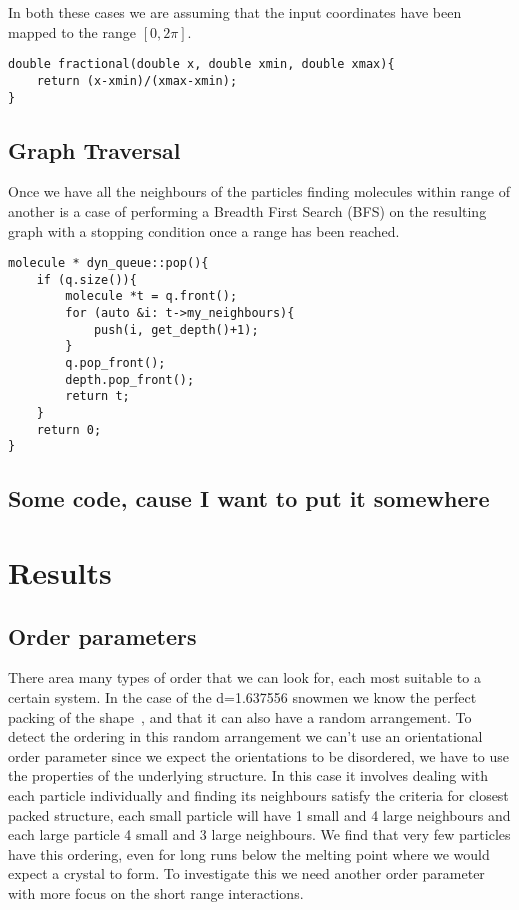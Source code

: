 In both these cases we are assuming that the input coordinates have been mapped to the range $[0,2\pi]$.

\begin{lstlisting}[language=myc]
double fractional(double x, double xmin, double xmax){
    return (x-xmin)/(xmax-xmin);
}

\end{lstlisting}

\section{Graph Traversal}
\label{sec:graph traversal}

Once we have all the neighbours of the particles finding molecules within range of another is a case of performing a Breadth First Search (BFS) on the resulting graph with a stopping condition once a range has been reached.

\begin{lstlisting}[language=myc]
molecule * dyn_queue::pop(){
    if (q.size()){
        molecule *t = q.front();
        for (auto &i: t->my_neighbours){
            push(i, get_depth()+1);
        }
        q.pop_front();
        depth.pop_front();
        return t;
    }
    return 0;
}
\end{lstlisting}

\section{Some code, cause I want to put it somewhere}

\chapter{Results}

\section{Order parameters}
\label{sec:order parameters}

There area many types of order that we can look for, each most suitable to a certain system. In the case of the d=1.637556 snowmen we know the perfect packing of the shape~\figref{}, and that it can also have a random arrangement. To detect the ordering in this random arrangement we can't use an orientational order parameter since we expect the orientations to be disordered, we have to use the properties of the underlying structure. In this case it involves dealing with each particle individually and finding its neighbours satisfy the criteria for closest packed structure, each small particle will have 1 small and 4 large neighbours and each large particle 4 small and 3 large neighbours\tocheck. We find that very few particles have this ordering, even for long runs below the melting point where we would expect a crystal to form. To investigate this we need another order parameter with more focus on the short range interactions.


